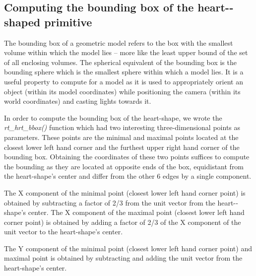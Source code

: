 \subsection{Computing the bounding box of the heart-­shaped primitive}

The   bounding   box   of   a   geometric   model   refers   to   the   box   with   the  
smallest   volume   within   which   the   model   lies   –   more   like   the   least   upper   bound  
of   the   set   of   all   enclosing   volumes.   The   spherical   equivalent   of   the   bounding  
box   is   the   bounding   sphere   which   is   the   smallest   sphere   within   which   a   model  
lies.   It   is   a   useful   property   to   compute   for   a   model   as   it   is   used   to   appropriately  
orient   an   object   (within   its   model   coordinates)   while   positioning   the   camera  
(within its world coordinates) and casting lights towards it.   

\hspace{30} In   order   to   compute   the   bounding   box   of   the   heart­-shape,   we   wrote   the  
\textit{rt\_hrt\_bbox()}   function   which   had   two   interesting   three­-dimensional   points   as  
parameters.   These   points   are   the   minimal   and   maximal   points   located   at   the  
closest   lower   left   hand   corner   and   the   furthest   upper   right   hand   corner   of   the  
bounding   box.   Obtaining   the   coordinates   of   these   two   points   suffices   to  
compute   the   bounding   as   they   are   located   at   opposite   ends   of   the   box,  
equidistant   from   the   heart-­shape's   center   and   differ   from   the   other   6   edges   by  
a single  component.  

\hspace{30} The   X   component   of   the   minimal   point   (closest   lower   left   hand   corner  
point)   is   obtained   by   subtracting   a   factor   of   2/3   from   the   unit   vector   from   the  
heart-­shape's   center.   The   X   component   of   the   maximal   point   (closest   lower   left  
hand   corner   point)   is   obtained   by   adding   a   factor   of   2/3   of   the   X   component   of  
the   unit   vector   to   the   heart-­shape's   center.

\hspace{30} The   Y   component   of   the   minimal  point   (closest   lower   left   hand   corner   point)
and   maximal   point   is   obtained   by  subtracting   and   adding   the   unit   vector   from   the   
heart-­shape's   center.   

